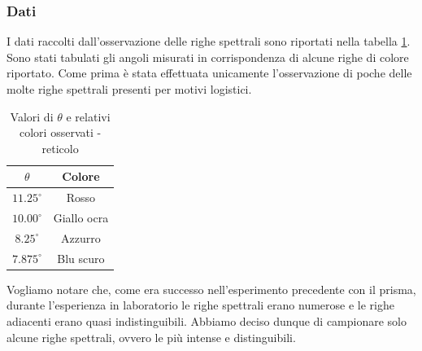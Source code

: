 \documentclass[a4paper]{article}
\begin{document}
\subsubsection{Dati}
I dati raccolti dall'osservazione delle righe spettrali sono riportati nella tabella \ref{tab:angolo_e_colore_gas_ignoto_reticolo}. Sono stati tabulati gli angoli misurati in corrispondenza di alcune righe di colore riportato. Come prima è stata effettuata unicamente l'osservazione di poche delle molte righe spettrali presenti per motivi logistici.
\begin{table}[htbp]
\centering
\begin{tabular}{|c|c|}
\hline
$\theta$ & Colore \\ \hline
$11.25^\circ$ & Rosso \\
$10.00^\circ$ & Giallo ocra \\
$8.25^\circ$  & Azzurro \\
$7.875^\circ$ & Blu scuro \\
\hline
\end{tabular}
\caption{Valori di $\theta$ e relativi colori osservati - reticolo}
\label{tab:angolo_e_colore_gas_ignoto_reticolo}
\end{table}
Vogliamo notare che, come era successo nell'esperimento precedente con il prisma, durante l'esperienza in laboratorio le righe spettrali erano numerose e le righe adiacenti erano quasi indistinguibili. Abbiamo deciso dunque di campionare solo alcune righe spettrali, ovvero le più intense e distinguibili. 
\end{document}
